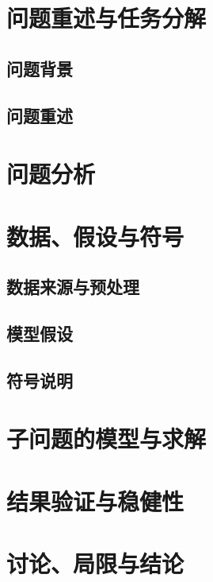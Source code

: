 
\section{问题重述与任务分解}
\subsection{问题背景}

\subsection{问题重述}

\section{问题分析}

\section{数据、假设与符号}
\subsection{数据来源与预处理}
\subsection{模型假设}
\subsection{符号说明}

\section{子问题的模型与求解}

\section{结果验证与稳健性}

\section{讨论、局限与结论}
